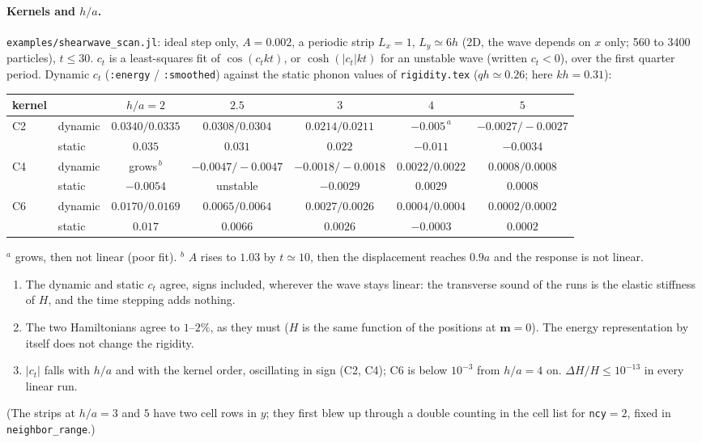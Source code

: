\documentclass[11pt,aps,preprint,nofootinbib,superscriptaddress,tightenlines]{revtex4-2}
\let\oldparagraph\paragraph
\renewcommand{\paragraph}{\par\bigskip\oldparagraph}
\begin{document}
\paragraph{Kernels and $h/a$.}  \texttt{examples/shearwave\_scan.jl}: ideal step only,
$A=0.002$, a periodic strip $L_x=1$, $L_y\simeq6h$ (2D, the wave depends on $x$ only;
560 to 3400 particles), $t\le30$.  $c_t$ is a least-squares fit of $\cos(c_tkt)$, or
$\cosh(|c_t|kt)$ for an unstable wave (written $c_t<0$), over the first quarter period.
Dynamic $c_t$ (\texttt{:energy} / \texttt{:smoothed}) against the static phonon values of
\texttt{rigidity.tex} ($qh\simeq0.26$; here $kh=0.31$):
\begin{center}
\begin{tabular}{llccccc}
\hline
kernel & & $h/a=2$ & $2.5$ & $3$ & $4$ & $5$ \\ \hline
C2 & dynamic & $0.0340/0.0335$ & $0.0308/0.0304$ & $0.0214/0.0211$ & $-0.005^{\,a}$ & $-0.0027/-0.0027$ \\
   & static  & $0.035$ & $0.031$ & $0.022$ & $-0.011$ & $-0.0034$ \\
C4 & dynamic & grows$^{\,b}$ & $-0.0047/-0.0047$ & $-0.0018/-0.0018$ & $0.0022/0.0022$ & $0.0008/0.0008$ \\
   & static  & $-0.0054$ & unstable & $-0.0029$ & $0.0029$ & $0.0008$ \\
C6 & dynamic & $0.0170/0.0169$ & $0.0065/0.0064$ & $0.0027/0.0026$ & $0.0004/0.0004$ & $0.0002/0.0002$ \\
   & static  & $0.017$ & $0.0066$ & $0.0026$ & $-0.0003$ & $0.0002$ \\
\hline
\end{tabular}
\end{center}
$^a$ grows, then not linear (poor fit).  $^b$ $A$ rises to $1.03$ by $t\simeq10$, then the
displacement reaches $0.9a$ and the response is not linear.

\begin{enumerate}
\item The dynamic and static $c_t$ agree, signs included, wherever the wave stays linear: the
  transverse sound of the runs is the elastic stiffness of $H$, and the time stepping adds
  nothing.
\item The two Hamiltonians agree to $1$--$2\%$, as they must ($H$ is the same function of
  the positions at $\bm m=0$).  The energy representation by itself does not change the
  rigidity.
\item $|c_t|$ falls with $h/a$ and with the kernel order, oscillating in sign (C2, C4); C6
  is below $10^{-3}$ from $h/a=4$ on.  $\Delta H/H\le10^{-13}$ in every linear run.
\end{enumerate}
(The strips at $h/a=3$ and $5$ have two cell rows in $y$; they first blew up through a
double counting in the cell list for \texttt{ncy}${}=2$, fixed in \texttt{neighbor\_range}.)
\end{document}
